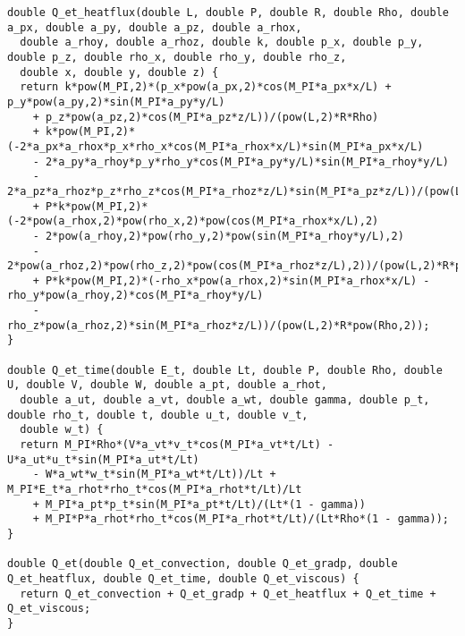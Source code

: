 \documentclass[10pt]{article}
\begin{document}
\begin{footnotesize}
\begin{verbatim}
double Q_et_heatflux(double L, double P, double R, double Rho, double a_px, double a_py, double a_pz, double a_rhox, 
  double a_rhoy, double a_rhoz, double k, double p_x, double p_y, double p_z, double rho_x, double rho_y, double rho_z, 
  double x, double y, double z) {
  return k*pow(M_PI,2)*(p_x*pow(a_px,2)*cos(M_PI*a_px*x/L) + p_y*pow(a_py,2)*sin(M_PI*a_py*y/L) 
	+ p_z*pow(a_pz,2)*cos(M_PI*a_pz*z/L))/(pow(L,2)*R*Rho) 
	+ k*pow(M_PI,2)*(-2*a_px*a_rhox*p_x*rho_x*cos(M_PI*a_rhox*x/L)*sin(M_PI*a_px*x/L) 
	- 2*a_py*a_rhoy*p_y*rho_y*cos(M_PI*a_py*y/L)*sin(M_PI*a_rhoy*y/L) 
	- 2*a_pz*a_rhoz*p_z*rho_z*cos(M_PI*a_rhoz*z/L)*sin(M_PI*a_pz*z/L))/(pow(L,2)*R*pow(Rho,2)) 
	+ P*k*pow(M_PI,2)*(-2*pow(a_rhox,2)*pow(rho_x,2)*pow(cos(M_PI*a_rhox*x/L),2) 
	- 2*pow(a_rhoy,2)*pow(rho_y,2)*pow(sin(M_PI*a_rhoy*y/L),2) 
	- 2*pow(a_rhoz,2)*pow(rho_z,2)*pow(cos(M_PI*a_rhoz*z/L),2))/(pow(L,2)*R*pow(Rho,3)) 
	+ P*k*pow(M_PI,2)*(-rho_x*pow(a_rhox,2)*sin(M_PI*a_rhox*x/L) - rho_y*pow(a_rhoy,2)*cos(M_PI*a_rhoy*y/L) 
	- rho_z*pow(a_rhoz,2)*sin(M_PI*a_rhoz*z/L))/(pow(L,2)*R*pow(Rho,2));
}

double Q_et_time(double E_t, double Lt, double P, double Rho, double U, double V, double W, double a_pt, double a_rhot, 
  double a_ut, double a_vt, double a_wt, double gamma, double p_t, double rho_t, double t, double u_t, double v_t, 
  double w_t) {
  return M_PI*Rho*(V*a_vt*v_t*cos(M_PI*a_vt*t/Lt) - U*a_ut*u_t*sin(M_PI*a_ut*t/Lt) 
	- W*a_wt*w_t*sin(M_PI*a_wt*t/Lt))/Lt + M_PI*E_t*a_rhot*rho_t*cos(M_PI*a_rhot*t/Lt)/Lt 
	+ M_PI*a_pt*p_t*sin(M_PI*a_pt*t/Lt)/(Lt*(1 - gamma)) 
	+ M_PI*P*a_rhot*rho_t*cos(M_PI*a_rhot*t/Lt)/(Lt*Rho*(1 - gamma));
}

double Q_et(double Q_et_convection, double Q_et_gradp, double Q_et_heatflux, double Q_et_time, double Q_et_viscous) {
  return Q_et_convection + Q_et_gradp + Q_et_heatflux + Q_et_time + Q_et_viscous;
}


\end{verbatim}
\end{footnotesize}
 

\end{document}
